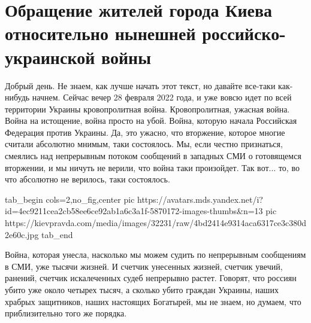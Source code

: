  
 
 
 
 

\section{Обращение жителей города Киева относительно нынешней российско-украинской войны}

Добрый день. Не знаем, как лучше начать этот текст, но давайте все-таки
как-нибудь начнем. Сейчас вечер 28 февраля 2022 года, и уже вовсю идет по всей
территории Украины кровопролитная война. Кровопролитная, ужасная война. Война
на истощение, война просто на убой. Война, которую начала Российская Федерация
против Украины. Да, это ужасно, что вторжение, которое многие считали абсолютно
мнимым, таки состоялось. Мы, если честно признаться, смеялись над непрерывным
потоком сообщений в западных СМИ о готовящемся вторжении, и мы ничуть не
верили, что война таки произойдет. Так вот... то, во что абсолютно не верилось,
таки состоялось.

\ifcmt
  tab_begin cols=2,no_fig,center
     pic https://avatars.mds.yandex.net/i?id=4ec9211cea2cb58ee6ce92ab1a6c3a1f-5870172-images-thumbs&n=13
		 pic https://kievpravda.com/media/images/32231/raw/4bd2414e9314aca6317ce3c380d2e60c.jpg
  tab_end
\fi

Война, которая унесла, насколько мы можем судить по непрерывным сообщениям в
СМИ, уже тысячи жизней. И счетчик унесенных жизней, счетчик увечий, ранений,
счетчик искалеченных судеб непрерывно растет.  Говорят, что россиян убито уже
около четырех тысяч, а сколько убито граждан Украины, наших храбрых защитников,
наших настоящих Богатырей, мы не знаем, но думаем, что приблизительно того же
порядка.

